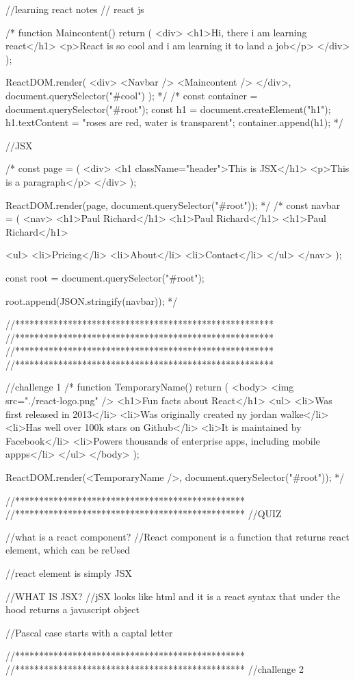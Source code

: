 //learning react notes
// react js

/* function Maincontent() {
  return (
    <div>
      <h1>Hi, there i am learning react</h1>
      <p>React is so cool and i am learning it to land a job</p>
    </div>
  );
}

ReactDOM.render(
  <div>
    <Navbar />
    <Maincontent />
  </div>,
  document.querySelector("#cool")
);
 */
/* 
const container = document.querySelector("#root");
const h1 = document.createElement("h1");
h1.textContent = "roses are red, water 
is transparent";
container.append(h1); */

//JSX

/* const page = (
  <div>
    <h1 className="header">This is JSX</h1>
    <p>This is a paragraph</p>
  </div>
);

ReactDOM.render(page, document.querySelector("#root"));
 */
/* 
const navbar = (
  <nav>
    <h1>Paul Richard</h1>
    <h1>Paul Richard</h1>
    <h1>Paul Richard</h1>

    <ul>
      <li>Pricing</li>
      <li>About</li>
      <li>Contact</li>
    </ul>
  </nav>
);

const root = document.querySelector("#root");

root.append(JSON.stringify(navbar));
 */

//******************************************************
//******************************************************
//******************************************************
//******************************************************


//challenge 1
/* 
function TemporaryName() {
  return (
    <body>
      <img src="./react-logo.png" />
      <h1>Fun facts about React</h1>
      <ul>
        <li>Was first released in 2013</li>
        <li>Was originally created ny jordan walke</li>
        <li>Has well over 100k stars on Github</li>
        <li>It is maintained by Facebook</li>
        <li>Powers thousands of enterprise apps, including mobile appps</li>
      </ul>
    </body>
  );
}

ReactDOM.render(<TemporaryName />, document.querySelector("#root"));
 */

//************************************************
//************************************************
//QUIZ

//what is a react component?
//React component is a function that returns react element, which can be reUsed

//react element is simply JSX

//WHAT IS JSX?
//jSX looks like html and it is a react syntax that under the hood returns a javascript object

//Pascal case starts with a captal letter

//************************************************
//************************************************
//challenge 2
